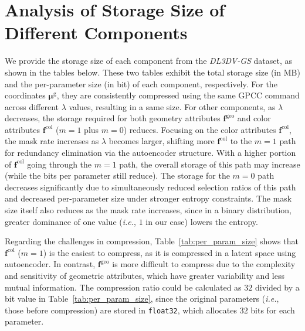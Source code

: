 \documentclass{article} %
\newcommand{\ie}{\textit{i.e.}}
\begin{document}
\section{Analysis of Storage Size of Different Components}
\label{sec:storage_size}
We provide the storage size of each component from the \textit{DL3DV-GS} dataset, as shown in the tables below. These two tables exhibit the total storage size (in MB) and the per-parameter size (in bit) of each component, respectively.
For the coordinates $\bm{\mu}^\text{g}$, they are consistently compressed using the same GPCC command across different $\lambda$ values, resulting in a same size. For other components, as $\lambda$ decreases, the storage required for both geometry attributes $\bm{f}^{\text{geo}}$ and color attributes $\bm{f}^{\text{col}}$ ($m=1$ plus $m=0$) reduces. Focusing on the color attributes $\bm{f}^{\text{col}}$, the mask rate increases as $\lambda$ becomes larger, shifting more $\bm{f}^{\text{col}}$ to the $m=1$ path for redundancy elimination via the autoencoder structure. With a higher portion of $\bm{f}^{\text{col}}$ going through the $m=1$ path, the overall storage of this path may increase (while the bits per parameter still reduce). The storage for the $m=0$ path decreases significantly due to simultaneously reduced selection ratios of this path and decreased per-parameter size under stronger entropy constraints. The mask size itself also reduces as the mask rate increases, since in a binary distribution, greater dominance of one value (\ie, $1$ in our case) lowers the entropy.

Regarding the challenges in compression, Table~\ref{tab:per_param_size} shows that $\bm{f}^{\text{col}}$ ($m=1$) is the easiest to compress, as it is compressed in a latent space using autoencoder. In contrast, $\bm{f}^{\text{geo}}$ is more difficult to compress due to the complexity and sensitivity of geometric attributes, which have greater variability and less mutual information. The compression ratio could be calculated as $32$ divided by a bit value in Table~\ref{tab:per_param_size}, since the original parameters (\ie, those before compression) are stored in \texttt{float32}, which allocates $32$ bits for each parameter.
\end{document}
